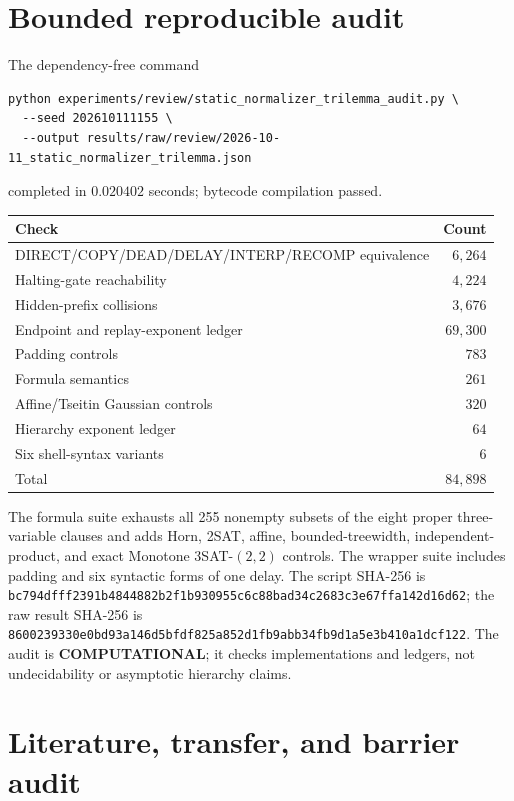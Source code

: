 \documentclass[11pt]{article}
\newcommand{\COMP}{\textbf{COMPUTATIONAL}}
\begin{document}
\section{Bounded reproducible audit}

The dependency-free command
\begin{verbatim}
python experiments/review/static_normalizer_trilemma_audit.py \
  --seed 202610111155 \
  --output results/raw/review/2026-10-11_static_normalizer_trilemma.json
\end{verbatim}
completed in $0.020402$ seconds; bytecode compilation passed.

\begin{center}
\begin{tabular}{lr}
\toprule
Check & Count\\
\midrule
DIRECT/COPY/DEAD/DELAY/INTERP/RECOMP equivalence & $6{,}264$\\
Halting-gate reachability & $4{,}224$\\
Hidden-prefix collisions & $3{,}676$\\
Endpoint and replay-exponent ledger & $69{,}300$\\
Padding controls & $783$\\
Formula semantics & $261$\\
Affine/Tseitin Gaussian controls & $320$\\
Hierarchy exponent ledger & $64$\\
Six shell-syntax variants & $6$\\
\midrule
Total & $84{,}898$\\
\bottomrule
\end{tabular}
\end{center}

The formula suite exhausts all 255 nonempty subsets of the eight proper
three-variable clauses and adds Horn, 2SAT, affine, bounded-treewidth,
independent-product, and exact Monotone $3$SAT-$(2,2)$ controls.  The wrapper
suite includes padding and six syntactic forms of one delay.  The script
SHA-256 is
\nolinkurl{bc794dfff2391b4844882b2f1b930955c6c88bad34c2683c3e67ffa142d16d62};
the raw result SHA-256 is
\nolinkurl{8600239330e0bd93a146d5bfdf825a852d1fb9abb34fb9d1a5e3b410a1dcf122}.
The audit is \COMP; it checks implementations and ledgers, not undecidability
or asymptotic hierarchy claims.

\section{Literature, transfer, and barrier audit}
\end{document}
